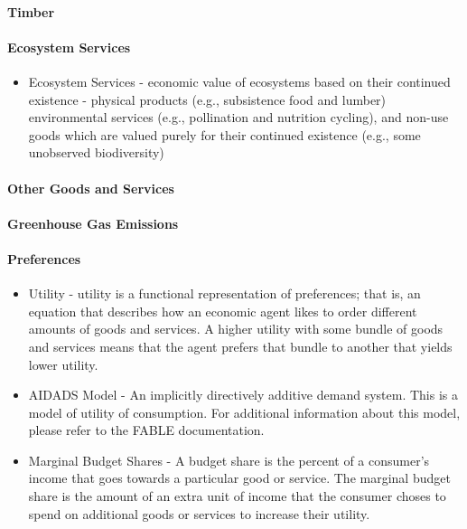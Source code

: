 \documentclass[10pt]{article}
\begin{document}
\paragraph{Timber}
\paragraph{Ecosystem Services}
\begin{itemize}
\item Ecosystem Services - economic value of ecosystems based on their continued existence - physical products (e.g., subsistence food and lumber) environmental services (e.g., pollination and nutrition cycling), and non-use goods which are valued purely for their continued existence (e.g., some unobserved biodiversity)
\end{itemize}
\paragraph{Other Goods and Services}
\paragraph{Greenhouse Gas Emissions}
\paragraph{Preferences}
\begin{itemize}
\item Utility - utility is a functional representation of preferences; that is, an equation that describes how an economic agent likes to order different amounts of goods and services. A higher utility with some bundle of goods and services means that the agent prefers that bundle to another that yields lower utility. 
\item AIDADS Model - An implicitly directively additive demand system. This is a model of utility of consumption. For additional information about this model, please refer to the FABLE documentation. 
\item Marginal Budget Shares - A budget share is the percent of a consumer's income that goes towards a particular good or service. The marginal budget share is the amount of an extra unit of income that the consumer choses to spend on additional goods or services to increase their utility. 
\end{itemize}
\end{document}

